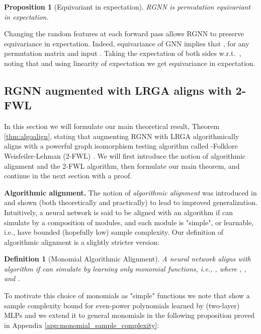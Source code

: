 \documentclass{article} \usepackage{iclr2021_conference,times}
\newcommand{\ie}{{i.e.}}
\newtheorem{proposition}{Proposition}
\newtheorem{definition}{Definition}
\begin{document}
\begin{proposition}[Equivariant in expectation]
RGNN is permutation equivariant in expectation.
\end{proposition}
Changing the random features at each forward pass allows RGNN to preserve equivariance in expectation. Indeed, equivariance of GNN implies that , for any permutation matrix  and input . Taking the expectation of both sides w.r.t.~, noting that  and using linearity of expectation we get equivariance in expectation.  












 


\subsection{RGNN augmented with LRGA aligns with 2-FWL}

In this section we will formulate our main theoretical result, Theorem \ref{thm:algoalign}, stating that augmenting RGNN with LRGA algorithmically aligns with a powerful graph isomorphism testing algorithm called -Folklore Weisfeiler-Lehman (2-FWL) \citep{grohe2015pebble,grohe2017descriptive}. We will first introduce the notion of algorithmic alignment and the 2-FWL algorithm, then formulate our main theorem, and continue in the next section with a proof. 

\textbf{Algorithmic alignment.} The notion of \emph{algorithmic alignment} was introduced in \cite{Xu2019algoalign} and shown (both theoretically and practically) to lead to improved generalization. Intuitively, a neural network  is said to be aligned with an algorithm  if  can simulate  by a composition of modules, and each module is "simple", or learnable, \ie, have bounded (hopefully low) sample complexity. Our definition of algorithmic alignment is a slightly stricter version: 
\begin{definition}[Monomial Algorithmic Alignment]
A neural network  aligns with algorithm  if  can simulate  by learning only monomial functions, \ie, , where , , and .
\end{definition}
To motivate this choice of monomials as "simple" functions we note that \citep{arora2019fine,Xu2019algoalign} show a sample complexity bound for even-power polynomials learned by (two-layer) MLPs and we extend it to general monomials in the following proposition proved in Appendix \ref{app:monomial_sample_complexity}:
\end{document}
